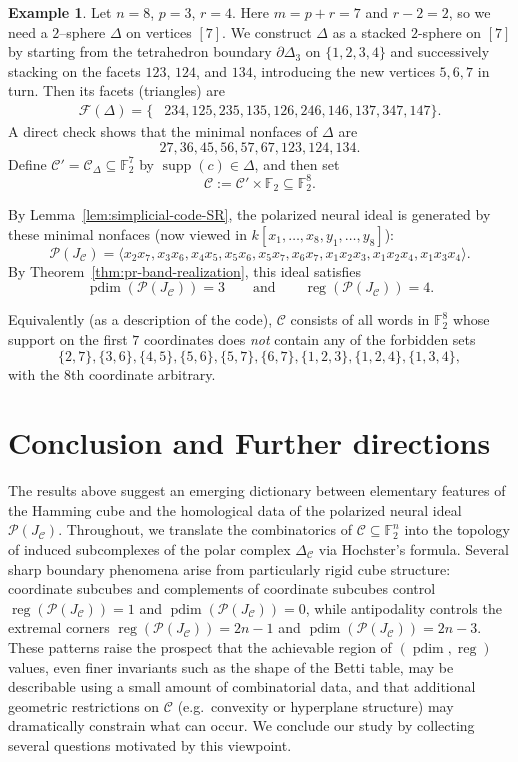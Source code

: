 \documentclass[12pt]{amsart}
\theoremstyle{remark}
\theoremstyle{definition}
\newtheorem{ex}[theorem]{Example}
\DeclareMathOperator{\reg}{reg}
\DeclareMathOperator{\pd}{pdim}
\DeclareMathOperator{\supp}{supp}
\newcommand{\F}{\mathbb{F}}
\newcommand{\C}{\mathcal{C}}
\def\P{{\mathcal P}}
\begin{document}
\begin{ex}\label{ex:n8p3r4}
Let $n=8$, $p=3$, $r=4$. Here $m=p+r=7$ and $r-2=2$, so we need a $2$--sphere $\Delta$ on vertices $[7]$. We construct $\Delta$ as a stacked $2$-sphere on $[7]$ by starting from the tetrahedron boundary
$\partial\Delta_3$ on $\{1,2,3,4\}$ and successively stacking on the facets $123$, $124$, and $134$,
introducing the new vertices $5,6,7$ in turn. Then its  facets (triangles) are 
\[
\begin{aligned}
\mathcal{F}(\Delta)=\{&
234, 125, 235, 135, 126, 246, 146, 137, 347, 147\}.
\end{aligned}
\]
A direct check shows that the minimal nonfaces of $\Delta$ are
\[
27, 36, 45, 56, 57, 67, 123, 124, 134.
\]
Define $\C'=\C_\Delta\subseteq \F_2^7$ by $\supp(c)\in\Delta$, and then set 
\[
\C:=\C'\times \F_2  \subseteq \F_2^8.
\]

By Lemma~\ref{lem:simplicial-code-SR}, the polarized neural ideal is 
generated by these minimal nonfaces (now viewed in $k[x_1,\dots,x_8,y_1,\dots,y_8]$):
\[
\P(J_\C)
=
\langle 
x_2x_7, x_3x_6, x_4x_5, x_5x_6, x_5x_7, x_6x_7, 
x_1x_2x_3, x_1x_2x_4, x_1x_3x_4
\rangle.
\]
By Theorem~\ref{thm:pr-band-realization}, this ideal satisfies
\[
\pd(\P(J_\C))=3
\qquad\text{and}\qquad
\reg(\P(J_\C))=4.
\]

Equivalently (as a description of the code), $\C$ consists of all words in $\F_2^8$ whose support
on the first $7$ coordinates does \emph{not} contain any of the forbidden sets
\[
\{2,7\},\{3,6\},\{4,5\},\{5,6\},\{5,7\},\{6,7\},\{1,2,3\},\{1,2,4\},\{1,3,4\},
\]
with the $8$th coordinate arbitrary.
\end{ex}

\section{Conclusion and Further directions}\label{sec:further-directions}

The results above suggest an emerging dictionary between elementary features of the Hamming cube and
the homological data of the polarized neural ideal $\P(J_\C)$. Throughout, we translate the
combinatorics of $\C\subseteq\F_2^n$ into the topology of induced subcomplexes of the polar complex
$\Delta_\C$ via Hochster’s formula. Several sharp boundary phenomena arise from particularly rigid
cube structure: coordinate subcubes and complements of coordinate subcubes control 
$\reg(\P(J_\C))=1$ and $\pd(\P(J_\C))=0$, while antipodality controls the extremal corners
$\reg(\P(J_\C))=2n-1$ and $\pd(\P(J_\C))=2n-3$. These patterns raise the prospect that the achievable
region of $(\pd,\reg)$ values,  even finer invariants such as the shape of the Betti table, may
be describable using a small amount of combinatorial data, and that additional geometric restrictions
on $\C$ (e.g.\ convexity or hyperplane structure) may dramatically constrain what can occur. We
conclude our study by collecting several questions motivated by this viewpoint.
\end{document}
